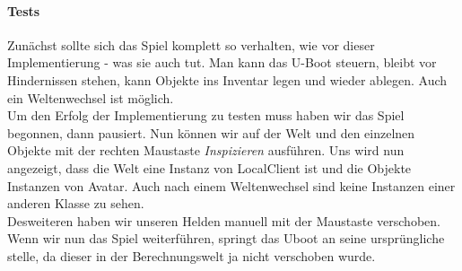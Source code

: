 \documentclass{pi1}
\begin{document}
\paragraph{Tests}
Zunächst sollte sich das Spiel komplett so verhalten, wie vor dieser Implementierung - was sie auch tut. Man kann das U-Boot steuern, bleibt vor Hindernissen stehen, kann Objekte ins Inventar legen und wieder ablegen. Auch ein Weltenwechsel ist möglich.\\
Um den Erfolg der Implementierung zu testen muss haben wir das Spiel begonnen, dann pausiert. Nun können wir auf der Welt und den einzelnen Objekte mit der rechten Maustaste \emph{Inspizieren} ausführen. Uns wird nun angezeigt, dass die Welt eine Instanz von LocalClient ist und die Objekte Instanzen von Avatar. Auch nach einem Weltenwechsel sind keine Instanzen einer anderen Klasse zu sehen.\\
Desweiteren haben wir unseren Helden manuell mit der Maustaste verschoben. Wenn wir nun das Spiel weiterführen, springt das Uboot an seine ursprüngliche stelle, da dieser in der Berechnungswelt ja nicht verschoben wurde. 
\end{document}
